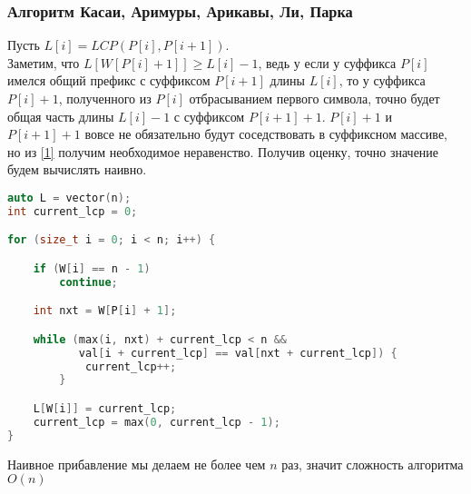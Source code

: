 \subsubsection{Алгоритм Касаи, Аримуры, Арикавы, Ли, Парка}
Пусть $L[i] = LCP(P[i], P[i + 1])$. \\
Заметим, что  $L[W[P[i] + 1]] \geq L[i] - 1$, ведь у если у суффикса $P[i]$ имелся общий префикс с суффиксом  $P[i + 1]$ длины  $L[i]$, то у суффикса  $P[i] + 1$, полученного из  $P[i]$ отбрасыванием первого символа, точно будет общая часть длины  $L[i] - 1$ с суффиксом  $P[i + 1] + 1$.  $P[i] + 1$ и  $P[i + 1] + 1$ вовсе не обязательно будут соседствовать в суффиксном массиве, но из \ref{1} получим необходимое неравенство. Получив оценку, точно значение будем вычислять наивно.
\begin{lstlisting}[language = C++]
auto L = vector(n);
int current_lcp = 0;

for (size_t i = 0; i < n; i++) {

    if (W[i] == n - 1)
        continue;

    int nxt = W[P[i] + 1];

    while (max(i, nxt) + current_lcp < n && 
           val[i + current_lcp] == val[nxt + current_lcp]) {
            current_lcp++;
        }

    L[W[i]] = current_lcp;
    current_lcp = max(0, current_lcp - 1);
}
\end{lstlisting}

Наивное прибавление мы делаем не более чем $n$ раз, значит сложность алгоритма  $O(n)$
